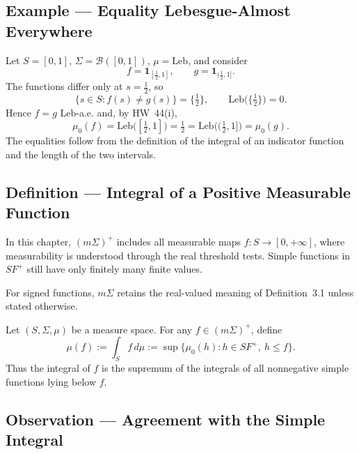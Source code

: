 \subsection*{Example --- Equality Lebesgue-Almost Everywhere}%
%

Let $S=[0,1]$, $\Sigma=\mathcal B([0,1])$, $\mu=\mathrm{Leb}$, and consider
\[
f=\mathbf1_{[\frac12,1]},\qquad
 g=\mathbf1_{(\frac12,1]}.
\]
The functions differ only at $s=\frac12$, so
\[
\{s\in S:f(s)\ne g(s)\}=\bigl\{\tfrac12\bigr\},
\qquad \mathrm{Leb}\bigl(\{\tfrac12\}\bigr)=0.
\]
Hence $f=g$ $\mathrm{Leb}$-a.e. and, by HW~44(i),
\[
\mu_0(f)
=\mathrm{Leb}\bigl([\tfrac12,1]\bigr)
=\tfrac12
=\mathrm{Leb}\bigl((\tfrac12,1]\bigr)
=\mu_0(g).
\]
The equalities follow from the definition of the integral of an indicator function and the length of the two intervals.

\subsection*{Definition --- Integral of a Positive Measurable Function}%
%

In this chapter, $(m\Sigma)^+$ includes all measurable maps $f:S\to[0,+\infty]$, where measurability is understood through the real threshold tests. Simple functions in $SF^+$ still have only finitely many finite values.

For signed functions, $m\Sigma$ retains the real-valued meaning of Definition~3.1 unless stated otherwise.

Let $(S,\Sigma,\mu)$ be a measure space. For any $f\in(m\Sigma)^+$, define
\[
\mu(f):=\int_S f\,d\mu
:=\sup\bigl\{\mu_0(h):h\in SF^+,\ h\le f\bigr\}.
\]
Thus the integral of $f$ is the supremum of the integrals of all nonnegative simple functions lying below $f$.

\subsection*{Observation --- Agreement with the Simple Integral}%
%

